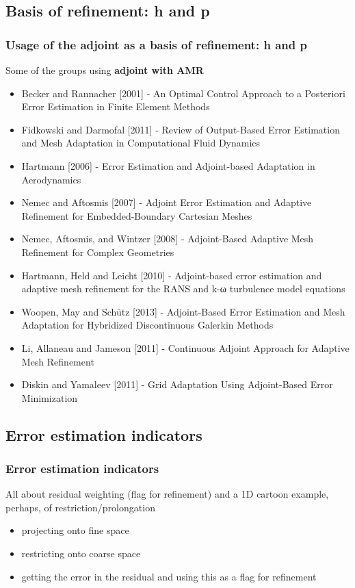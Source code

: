 \documentclass{beamer}
\begin{document}
\subsection[Usage]{Basis of refinement: h and p}
\begin{frame}%
\frametitle{\scriptsize{Usage of the adjoint as a basis of refinement: h and p}}
\scriptsize
Some of the groups using \textbf{adjoint with AMR}
\begin{itemize}
\item Becker and Rannacher [2001] - An Optimal Control Approach to a Posteriori Error Estimation in Finite Element Methods
\item Fidkowski and Darmofal [2011] - Review of Output-Based Error Estimation and Mesh Adaptation in Computational Fluid Dynamics
\item Hartmann [2006] - Error Estimation and Adjoint-based Adaptation in Aerodynamics
\item Nemec and Aftosmis [2007] - Adjoint Error Estimation and Adaptive Refinement for Embedded-Boundary Cartesian Meshes
\item Nemec, Aftosmis, and Wintzer [2008] - Adjoint-Based Adaptive Mesh Refinement for Complex Geometries
\item Hartmann, Held and Leicht [2010] - Adjoint-based error estimation and adaptive mesh refinement for the RANS and k-ω turbulence model equations
\item Woopen, May and Sch{\"u}tz [2013] - Adjoint-Based Error Estimation and Mesh Adaptation for Hybridized Discontinuous Galerkin Methods
\item Li, Allaneau and Jameson [2011] - Continuous Adjoint Approach for Adaptive Mesh Refinement
\item Diskin and Yamaleev [2011] - Grid Adaptation Using Adjoint-Based Error Minimization
\end{itemize}
\end{frame}


\subsection[Estimation]{Error estimation indicators}
\begin{frame}
\scriptsize
\frametitle{Error estimation indicators}
All about residual weighting (flag for refinement) and a 1D cartoon example, perhaps, of restriction/prolongation
\begin{itemize}
\item projecting onto fine space
\item restricting onto coarse space
\item getting the error in the residual and using this as a flag for refinement
\end{itemize}
\end{frame}
\end{document}
